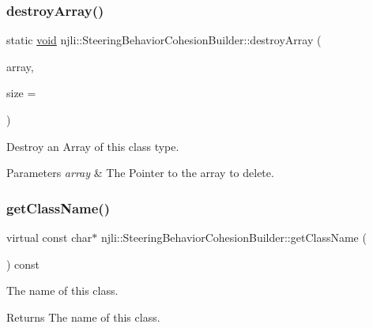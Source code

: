 \subsubsection{\texorpdfstring{destroy\+Array()}{destroyArray()}}
{\footnotesize\ttfamily static \mbox{\hyperlink{_thread_8h_af1e856da2e658414cb2456cb6f7ebc66}{void}} njli\+::\+Steering\+Behavior\+Cohesion\+Builder\+::destroy\+Array (\begin{DoxyParamCaption}\item[{\mbox{\hyperlink{classnjli_1_1_steering_behavior_cohesion_builder}{Steering\+Behavior\+Cohesion\+Builder}} $\ast$$\ast$}]{array,  }\item[{const \mbox{\hyperlink{_util_8h_a10e94b422ef0c20dcdec20d31a1f5049}{u32}}}]{size = {} }\end{DoxyParamCaption})\hspace{0.3cm}{\ttfamily [static]}}

Destroy an Array of this class type.


\begin{DoxyParams}{Parameters}
{\em array} & The Pointer to the array to delete. \\
\hline
\end{DoxyParams}
\mbox{\label{classnjli_1_1_steering_behavior_cohesion_builder_a3e53592fa685890b96123f68ee15fc3e}} 
\subsubsection{\texorpdfstring{get\+Class\+Name()}{getClassName()}}
{\footnotesize\ttfamily virtual const char$\ast$ njli\+::\+Steering\+Behavior\+Cohesion\+Builder\+::get\+Class\+Name (\begin{DoxyParamCaption}{ }\end{DoxyParamCaption}) const\hspace{0.3cm}{\ttfamily [virtual]}}

The name of this class.

\begin{DoxyReturn}{Returns}
The name of this class. 
\end{DoxyReturn}


